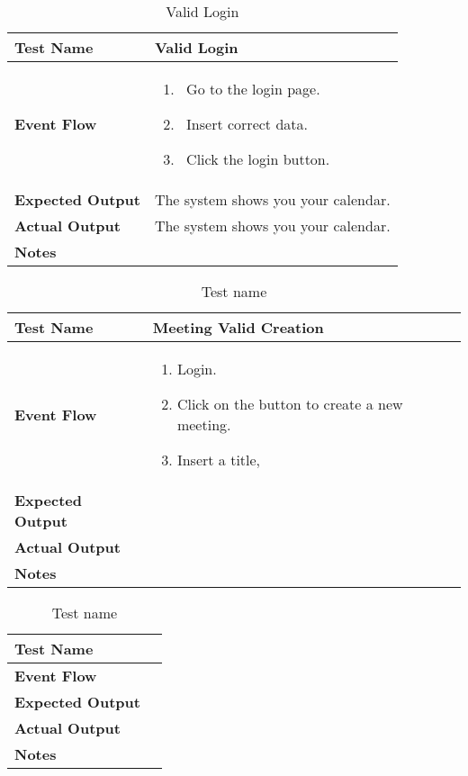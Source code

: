 \begin{table}[h]	
\centering
\def\arraystretch{1.5}
\begin{tabular}{|m{7cm}|m{7cm}|}
	\hline
	\textbf{Test Name}            &  Valid Login  \\ \hline
	\textbf{Event Flow}             &  
		\begin{enumerate}
			\item~Go to the login page.
			\item~Insert correct data.
			\item~Click the login button.
		\end{enumerate}
	 \\ \hline
	\textbf{Expected Output}  &  The system shows you your calendar.   \\ \hline
	\textbf{Actual Output}       &  The system shows you your calendar.   \\ \hline
	\textbf{Notes} & \\ \hline
\end{tabular}
\caption{Valid Login}
\end{table}


\begin{table}[h]	
\centering
\def\arraystretch{1.5}
\begin{tabular}{|m{7cm}|m{7cm}|}
	\hline
	\textbf{Test Name}            & Meeting Valid Creation   \\ \hline
	\textbf{Event Flow}             & 
	 	\begin{enumerate}
	 	\item Login.
	 	\item Click on the button to create a new meeting.
	 	\item Insert a title, 
	 \end{enumerate} \\ \hline
	\textbf{Expected Output}  &     \\ \hline
	\textbf{Actual Output}       &     \\ \hline
	\textbf{Notes} & \\ \hline
\end{tabular}
\caption{Test name}
\end{table}


\begin{table}[h]	
\centering
\def\arraystretch{1.5}
\begin{tabular}{|m{7cm}|m{7cm}|}
	\hline
	\textbf{Test Name}            &    \\ \hline
	\textbf{Event Flow}             &   \\ \hline
	\textbf{Expected Output}  &     \\ \hline
	\textbf{Actual Output}       &     \\ \hline
	\textbf{Notes} & \\ \hline
\end{tabular}
\caption{Test name}
\end{table}


